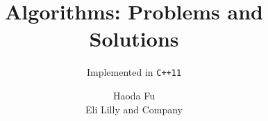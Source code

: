 \documentclass[graybox,envcountchap,sectrefs]{svmono}
\begin{document}
\author{Haoda Fu\\
Eli Lilly and Company}
\title{Algorithms: Problems and Solutions}
\subtitle{Implemented in \texttt{C++11}}
\maketitle

\frontmatter%


%

%


\tableofcontents

%


\mainmatter%
%

%
%







\backmatter%

%
\printindex

\end{document}
